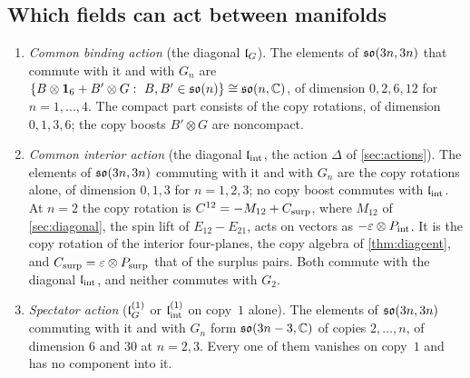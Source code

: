 \subsection{Which fields can act between manifolds}
\label{d7:sec:exist}

\begin{proposition}
\label{d7:prop:exist}
\begin{enumerate}[label=(\roman*),leftmargin=2.2em]
\item \emph{Common binding action} (the diagonal $\mathfrak l_G$). The elements of $\mathfrak{so}(3n,3n)$ that commute with it and with $G_n$ are
$\{B\otimes\mathbf 1_6+B'\otimes G:\ B,B'\in\mathfrak{so}(n)\}\cong\mathfrak{so}(n,\mathbb{C})$, of dimension $0,2,6,12$ for $n=1,\dots,4$. The compact part consists of the copy
rotations, of dimension $0,1,3,6$; the copy boosts $B'\otimes G$ are noncompact.
\item \emph{Common interior action} (the diagonal $\mathfrak l_{\rm int}$, the action $\Delta$ of \cref{sec:actions}). The elements of
$\mathfrak{so}(3n,3n)$ commuting with it and with $G_n$ are the copy rotations alone, of dimension $0,1,3$ for $n=1,2,3$; no copy boost commutes with $\mathfrak l_{\rm int}$.
At $n=2$ the copy rotation is $C^{12}=-M_{12}+C_{\rm surp}$, where $M_{12}$ of \cref{sec:diagonal}, the spin lift of $E_{12}-E_{21}$, acts on vectors as $-\varepsilon\otimes P_{\rm int}$. It is the copy rotation of the interior
four-planes, the copy algebra of \cref{thm:diagcent}, and $C_{\rm surp}=\varepsilon\otimes P_{\rm surp}$ that of the surplus pairs. Both
commute with the diagonal $\mathfrak l_{\rm int}$, and neither commutes with $G_2$.
\item \emph{Spectator action} ($\mathfrak l_G^{(1)}$ or $\mathfrak l_{\rm int}^{(1)}$ on copy~$1$ alone). The elements of $\mathfrak{so}(3n,3n)$ commuting with it and with $G_n$ form
$\mathfrak{so}(3n-3,\mathbb{C})$ of copies $2,\dots,n$, of dimension $6$ and $30$ at $n=2,3$. Every one of them vanishes on copy~$1$ and has no component into it.
\end{enumerate}
\end{proposition}


